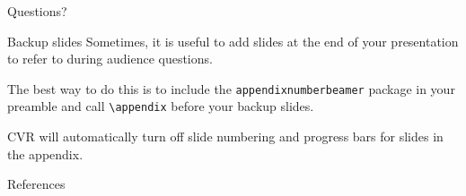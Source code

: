 \documentclass[10pt, fleqn, dvipsnames]{beamer}
\begin{document}
\begin{frame}
  Questions?
\end{frame}

\appendix


\begin{frame}{Backup slides}
  Sometimes, it is useful to add slides at the end of your presentation to
  refer to during audience questions.

  The best way to do this is to include the \verb|appendixnumberbeamer|
  package in your preamble and call \verb|\appendix| before your backup slides.

  CVR will automatically turn off slide numbering and progress bars for
  slides in the appendix.
\end{frame}


\begin{frame}{References}

  \scriptsize
  \setlength{\bibsep}{2ex}
  
  \def\newblock{}
  

\end{frame}
\end{document}
